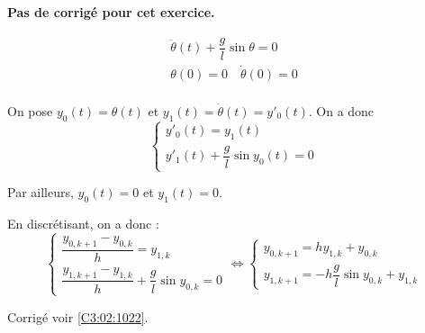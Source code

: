 \normaltrue \difficilefalse \tdifficilefalse
\correctionfalse


\setcounter{question}{0}
\ifcorrection
\else
\textbf{Pas de corrigé pour cet exercice.}
\fi



$$
\begin{array}{l}
\ddot{\theta}(t) + \dfrac{g}{l}\sin \theta = 0\\
\theta(0) = 0 \quad \dot{\theta}(0) = 0 \\
\end{array} 
$$


\ifprof
On pose $y_0(t) = \theta(t) $ et $y_1(t) = \dot{\theta}(t) = y'_0(t) $. On a donc 
$$
\left\{
\begin{array}{l}
y'_0(t) = y_1(t) \\
y'_1(t) + \dfrac{g}{l} \sin y_0(t) = 0
\end{array} 
\right.
$$

Par ailleurs, $y_0(t) = 0 $ et $y_1(t) =0$.

En discrétisant, on a donc :
$$
\left\{
\begin{array}{l}
\dfrac{y_{0,k+1}-y_{0,k}}{h} = y_{1,k} \\
\dfrac{y_{1,k+1}-y_{1,k}}{h} + \dfrac{g}{l} \sin y_{0,k} = 0
\end{array} 
\right.
\Longleftrightarrow
\left\{
\begin{array}{l}
y_{0,k+1} = h y_{1,k} + y_{0,k}\\
y_{1,k+1} = - h \dfrac{g}{l} \sin y_{0,k}  + y_{1,k}
\end{array} 
\right.
$$
\else
\fi



 

\ifprof
\else
\begin{flushright}
\footnotesize{Corrigé  voir \ref{C3:02:1022}.}
\end{flushright}%
\fi